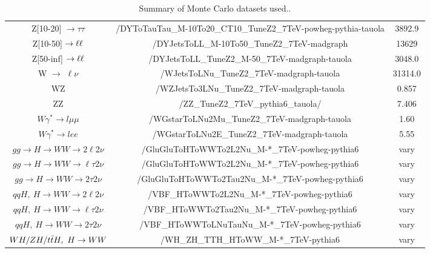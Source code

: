 \begin{table}[!ht]
\begin{center}
{\begin{tabular}{|c|c|c|}
Z[10-20]  $\rightarrow \tau\tau$  	 &   /DYToTauTau\_M-10To20\_CT10\_TuneZ2\_7TeV-powheg-pythia-tauola    &  3892.9 \\
Z[10-50]  $\rightarrow \ell\ell$         &   /DYJetsToLL\_M-10To50\_TuneZ2\_7TeV-madgraph                      & 13629 \\
Z[50-inf] $\rightarrow \ell\ell$         &   /DYJetsToLL\_TuneZ2\_M-50\_7TeV-madgraph-tauola                   & 3048.0 \\
W $\rightarrow$ $\ell\nu$           	 &   /WJetsToLNu\_TuneZ2\_7TeV-madgraph-tauola                         &  31314.0 \\
WZ                               	 &   /WZJetsTo3LNu\_TuneZ2\_7TeV-madgraph-tauola                       &  0.857 \\
ZZ                               	 &   /ZZ\_TuneZ2\_7TeV\_pythia6\_tauola/                               &  7.406 \\
$W\gamma^{*}\rightarrow l\mu\mu$         &   /WGstarToLNu2Mu\_TuneZ2\_7TeV-madgraph-tauola                     &  1.60 \\ 
$W\gamma^{*}\rightarrow lee$             &   /WGstarToLNu2E\_TuneZ2\_7TeV-madgraph-tauola                      &  5.55 \\ 
$gg \to H \to WW \to 2\ell2\nu$          &   /GluGluToHToWWTo2L2Nu\_M-*\_7TeV-powheg-pythia6                   & vary \\
$gg \to H \to WW \to \ell\tau2\nu$       &   /GluGluToHToWWTo2L2Nu\_M-*\_7TeV-powheg-pythia6                   & vary \\
$gg \to H \to WW \to 2\tau2\nu$          &   /GluGluToHToWWTo2Tau2Nu\_M-*\_7TeV-powheg-pythia6                 & vary \\
$qqH,~H \to WW \to 2\ell2\nu$            &   /VBF\_HToWWTo2L2Nu\_M-*\_7TeV-powheg-pythia6                      & vary \\
$qqH,~ H \to WW \to \ell\tau2\nu$	 &   /VBF\_HToWWTo2Tau2Nu\_M-*\_7TeV-powheg-pythia6                    & vary \\
$qqH,~H \to WW \to 2\tau2\nu$	         &   /VBF\_HToWWToLNuTauNu\_M-*\_7TeV-powheg-pythia6                   & vary \\
$WH/ZH/t\bar{t} H,~H\to WW$                &   /WH\_ZH\_TTH\_HToWW\_M-*\_7TeV-pythia6                            & vary \\
\hline
\hline
\end{tabular}
}
\caption{Summary of Monte Carlo datasets used.\label{tab:DatasetsMC}.}
\end{center}
\end{table}

